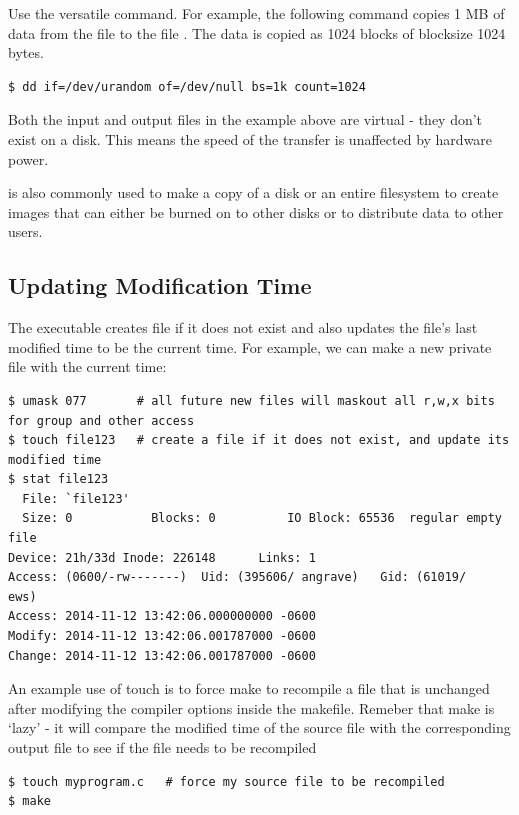 Use the versatile  command. For example, the following command copies 1 MB of data from the file  to the file . The data is copied as 1024 blocks of blocksize 1024 bytes.

\begin{lstlisting}
$ dd if=/dev/urandom of=/dev/null bs=1k count=1024
\end{lstlisting}

Both the input and output files in the example above are virtual - they don't exist on a disk. This means the speed of the transfer is unaffected by hardware power.

 is also commonly used to make a copy of a disk or an entire filesystem to create images that can either be burned on to other disks or to distribute data to other users.

\subsection{Updating Modification Time}\label{what-happens-when-i-touch-a-file}

The  executable creates file if it does not exist and also updates the file's last modified time to be the current time. For example, we can make a new private file with the current time:

\begin{lstlisting}
$ umask 077       # all future new files will maskout all r,w,x bits for group and other access
$ touch file123   # create a file if it does not exist, and update its modified time
$ stat file123
  File: `file123'
  Size: 0           Blocks: 0          IO Block: 65536  regular empty file
Device: 21h/33d Inode: 226148      Links: 1
Access: (0600/-rw-------)  Uid: (395606/ angrave)   Gid: (61019/     ews)
Access: 2014-11-12 13:42:06.000000000 -0600
Modify: 2014-11-12 13:42:06.001787000 -0600
Change: 2014-11-12 13:42:06.001787000 -0600
\end{lstlisting}

An example use of touch is to force make to recompile a file that is unchanged after modifying the compiler options inside the makefile. Remeber that make is `lazy' - it will compare the modified time of the source file with the corresponding output file to see if the file needs to be recompiled

\begin{lstlisting}
$ touch myprogram.c   # force my source file to be recompiled
$ make
\end{lstlisting}

